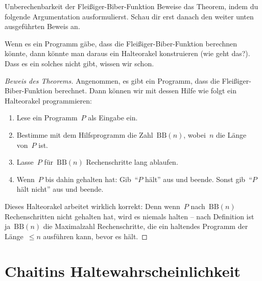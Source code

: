 \documentclass[twoside]{../zirkelblatt1415}
\theoremstyle{definition}
\theoremstyle{plain}
\theoremstyle{remark}
\newenvironment{listing}{
  \renewcommand*\theenumi{\arabic{enumi}}
  \renewcommand{\labelenumi}{\theenumi.}
  \begin{enumerate}\itemsep0em}{\end{enumerate}}
\newcommand{\BB}{\mathrm{BB}}
\begin{document}
\begin{aufgabe}{Unberechenbarkeit der Fleißiger-Biber-Funktion}
\label{aufg:bb}
Beweise das Theorem, indem du folgende Argumentation ausformulierst. Schau dir
erst danach den weiter unten ausgeführten Beweis an.

Wenn es ein Programm gäbe, dass die Fleißiger-Biber-Funktion
berechnen könnte, dann könnte man daraus ein Halteorakel konstruieren (wie geht
das?). Dass es ein solches nicht gibt, wissen wir schon.
\end{aufgabe}

\begin{proof}[Beweis des Theorems]
Angenommen, es gibt ein Programm, dass die Fleißiger-Biber-Funktion
berechnet. Dann können wir mit dessen Hilfe wie folgt ein Halteorakel programmieren:
\begin{listing}
\item Lese ein Programm~$P$ als Eingabe ein.
\item Bestimme mit dem Hilfsprogramm die Zahl~$\BB(n)$, wobei~$n$ die Länge
von~$P$ ist.
\item Lasse~$P$ für~$\BB(n)$ Rechenschritte lang ablaufen.
\item Wenn~$P$ bis dahin gehalten hat: Gib~"`$P$ hält"' aus und beende.
Sonst gib~"`$P$ hält nicht"' aus und beende.
\end{listing}
Dieses Halteorakel arbeitet wirklich korrekt: Denn wenn~$P$ nach~$\BB(n)$
Rechenschritten nicht gehalten hat, wird es niemals halten -- nach Definition
ist ja~$\BB(n)$ die Maximalzahl Rechenschritte, die ein haltendes Programm der
Länge~$\leq n$ ausführen kann, bevor es hält.
\end{proof}


\section{Chaitins Haltewahrscheinlichkeit}
\end{document}
